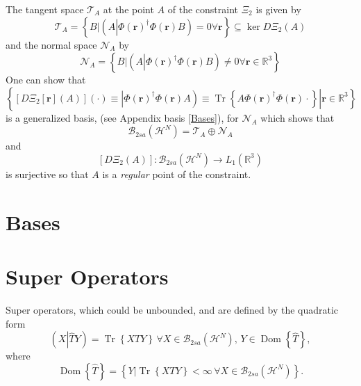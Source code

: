 \documentclass[aps,preprint]{revtex4}%
\begin{document}
The tangent space $\mathcal{T}_{A}$ at the point $A$ of the constraint
$\Xi_{2}$ is given by
\begin{equation}
\mathcal{T}_{A}=\left\{  \left.  B\right\vert \left(  A\left\vert \Phi\left(
\boldsymbol{r}\right)  ^{\dagger}\Phi\left(  \boldsymbol{r}\right)  \right.
B\right)  =0\forall\boldsymbol{r}\right\}  \subseteq\ker D\Xi_{2}\left(
A\right)
\end{equation}
and the normal space $\mathcal{N}_{A}$ by
\begin{equation}
\mathcal{N}_{A}=\left\{  \left.  B\right\vert \left(  A\left\vert \Phi\left(
\boldsymbol{r}\right)  ^{\dagger}\Phi\left(  \boldsymbol{r}\right)  \right.
B\right)  \neq0\forall\boldsymbol{r\in}\mathbb{R}^{3}\right\}
\end{equation}
One can show that $\left\{  \left.  \left[  D\Xi_{2}\left[  \boldsymbol{r}%
\right]  \left(  A\right)  \right]  \left(  \cdot\right)  \equiv\left\vert
\Phi\left(  \boldsymbol{r}\right)  ^{\dagger}\Phi\left(  \boldsymbol{r}%
\right)  A\right)  \equiv\operatorname{Tr}\left\{  A\Phi\left(  \boldsymbol{r}%
\right)  ^{\dagger}\Phi\left(  \boldsymbol{r}\right)  \cdot\right\}
\right\vert \boldsymbol{r\in}\mathbb{R}^{3}\right\}  $ is a generalized basis,
(see Appendix basis \ref{Bases}), for $\mathcal{N}_{A}$ which shows that
\begin{equation}
\mathcal{B}_{2sa}\left(  \mathcal{H}^{N}\right)  =\mathcal{T}_{A}%
\oplus\mathcal{N}_{A}%
\end{equation}
and
\begin{equation}
\left[  D\Xi_{2}\left(  A\right)  \right]  :\mathcal{B}_{2sa}\left(
\mathcal{H}^{N}\right)  \rightarrow L_{1}\left(  \mathbb{R}^{3}\right)
\end{equation}
is surjective so that $A$ is a \emph{regular }\cite{Hestenes}\emph{ }point of
the constraint.

\section{Bases \label{Bases}}

\section{Super Operators \label{super}}

Super operators, which could be unbounded, and are defined by the quadratic
form
\begin{equation}
\left(  X\left\vert \widehat{T}Y\right.  \right)  =\operatorname{Tr}\left\{
XTY\right\}  \,\forall X\in\mathcal{B}_{2sa}\left(  \mathcal{H}^{N}\right)
,\,Y\in\operatorname{Dom}\left\{  \widehat{T}\right\}  ,
\end{equation}
where
\[
\operatorname{Dom}\left\{  \widehat{T}\right\}  =\left\{  \left.  Y\right\vert
\operatorname{Tr}\left\{  XTY\right\}  <\infty\,\forall X\in\mathcal{B}%
_{2sa}\left(  \mathcal{H}^{N}\right)  \right\}  .
\]
\end{document}

